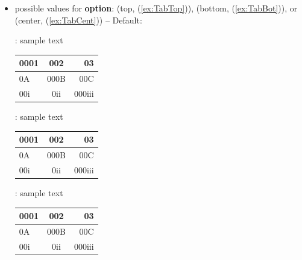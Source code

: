 \begin{frame}[fragile]

\begin{itemize}
	\item possible values for \textbf{option}:  (top, (\ref{ex:TabTop})),  (bottom, (\ref{ex:TabBot})), or  (center, (\ref{ex:TabCent})) -- Default: 
	
	\begin{exe}
		\ex\label{ex:TabTop} :		
		sample text	
		\begin{tabular}[t]{l|c|r}
			0001 & 002 & 03 \\
			\hline
			0A & 000B & 00C \\
			\hline
			00i  & 0ii  & 000iii  \\
		\end{tabular}
	
\pause 
	
		\ex\label{ex:TabBot}  :	
		sample text	
		\begin{tabular}[b]{l|c|r}
			0001 & 002 & 03 \\
			\hline
			0A & 000B & 00C \\
			\hline
			00i  & 0ii  & 000iii  \\
		\end{tabular}

\pause 

		\ex\label{ex:TabCent}  :
		sample text	
		\begin{tabular}[c]{l|c|r}
			0001 & 002 & 03 \\
			\hline
			0A & 000B & 00C \\
			\hline
			00i  & 0ii  & 000iii  \\
		\end{tabular}
	\end{exe}
\end{itemize}

\end{frame}



